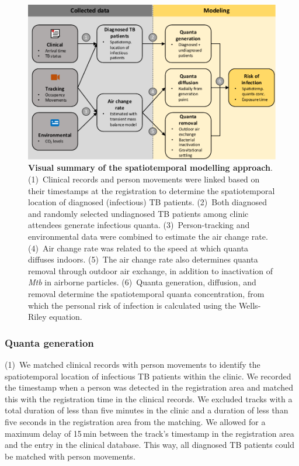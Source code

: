 \documentclass[fleqn,11pt]{wlscirep}
\begin{document}
\begin{figure}[!htpb]
    \centering
    \includegraphics{doc/model-flow-chart.pdf}
    \caption{\textbf{Visual summary of the spatiotemporal modelling approach}. (1)~Clinical records and person movements were linked based on their timestamps at the registration to determine the spatiotemporal location of diagnosed (infectious) TB patients. (2)~Both diagnosed and randomly selected undiagnosed TB patients among clinic attendees generate infectious quanta. (3)~Person-tracking and environmental data were combined to estimate the air change rate. (4)~Air change rate was related to the speed at which quanta diffuses indoors. (5)~The air change rate also determines quanta removal through outdoor air exchange, in addition to inactivation of \emph{Mtb} in airborne particles. (6)~Quanta generation, diffusion, and removal determine the spatiotemporal quanta concentration, from which the personal risk of infection is calculated using the Wells-Riley equation.}
    \label{fig:modeling-flow}
\end{figure}

\subsubsection*{Quanta generation}

(1)~We matched clinical records with person movements to identify the spatiotemporal location of infectious TB patients within the clinic. We recorded the timestamp when a person was detected in the registration area and matched this with the registration time in the clinical records. We excluded tracks with a total duration of less than five minutes in the clinic and a duration of less than five seconds in the registration area from the matching. We allowed for a maximum delay of 15\,min between the track's timestamp in the registration area and the entry in the clinical database. This way, all diagnosed TB patients could be matched with person movements. 
\end{document}
